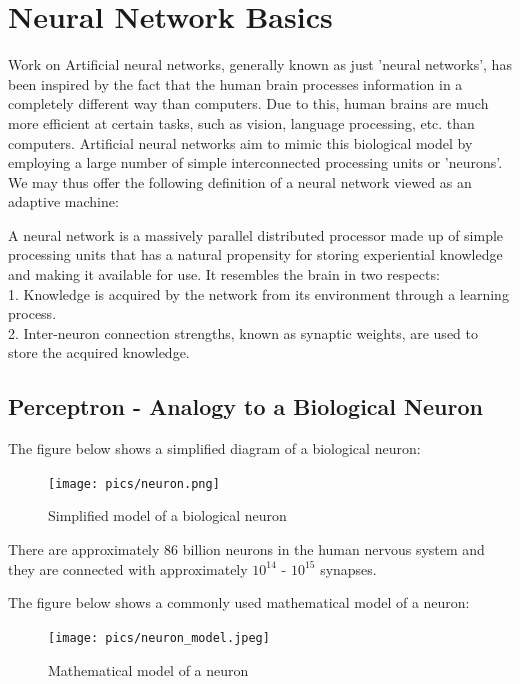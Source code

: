 \documentclass[twoside]{article}
\begin{document}
\section{Neural Network Basics}
Work on Artificial neural networks, generally known as just 'neural networks', has been inspired by the fact that the human brain processes information in a completely different way than computers. Due to this, human brains are much more efficient at certain tasks, such as vision, language processing, etc. than computers. Artificial neural networks aim to mimic this biological model by employing a large number of simple interconnected processing units or 'neurons'.  We may thus offer the following definition of a neural network viewed as an adaptive machine\cite{haykin}:

A neural network is a massively parallel distributed processor made up of simple processing units that has a natural propensity for storing experiential knowledge and making it available for use. It resembles the brain in two respects:\\
1. Knowledge is acquired by the network from its environment through a learning process.\\
2. Inter-neuron connection strengths, known as synaptic weights, are used to store the acquired knowledge.

\subsection{Perceptron - Analogy to a Biological Neuron}
The figure below shows a simplified diagram of a biological neuron:

\begin{figure}[!htb]
\centering
\texttt{[image: pics/neuron.png]}
\caption{Simplified model of a biological neuron\cite{cs231n-website}}
\label{fig:bio-neuron}
\end{figure}

There are approximately 86 billion neurons in the human nervous system and they are connected with approximately $10^{14}$ - $10^{15}$ synapses\cite{cs231n-website}.

The figure below shows a commonly used mathematical model of a neuron:

\begin{figure}[!htb]
\centering
\texttt{[image: pics/neuron\_model.jpeg]}
\caption{Mathematical model of a neuron\cite{cs231n-website}}
\label{fig:neuron_model}
\end{figure}
\end{document}
